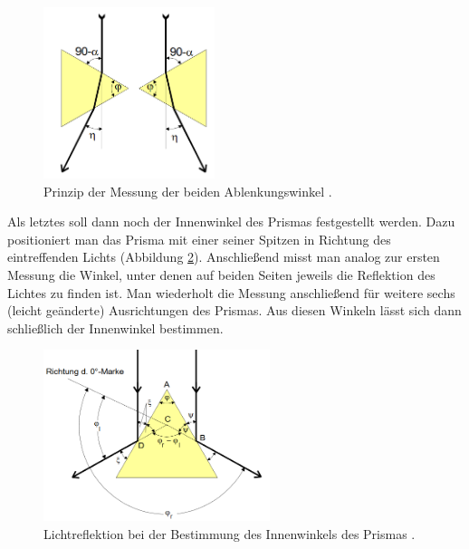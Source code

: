 \begin{figure}[H]
  \centering
  \includegraphics[height=5cm]{eta.PNG}
  \caption{Prinzip der Messung der beiden Ablenkungswinkel \cite{sample}.}
  \label{fig:eta}
\end{figure}

Als letztes soll dann noch der Innenwinkel des Prismas festgestellt werden. Dazu positioniert man das Prisma mit einer seiner Spitzen in
Richtung des eintreffenden Lichts (Abbildung \ref{fig:phi}). Anschließend misst man analog zur ersten Messung die Winkel, unter denen auf beiden Seiten jeweils
die Reflektion des Lichtes zu finden ist. Man wiederholt die Messung anschließend für weitere sechs (leicht geänderte) Ausrichtungen
des Prismas. Aus diesen Winkeln lässt sich dann schließlich der Innenwinkel bestimmen.

\begin{figure}[H]
  \centering
  \includegraphics[height=5cm]{phi.PNG}
  \caption{Lichtreflektion bei der Bestimmung des Innenwinkels des Prismas \cite{sample}.}
  \label{fig:phi}
\end{figure}
